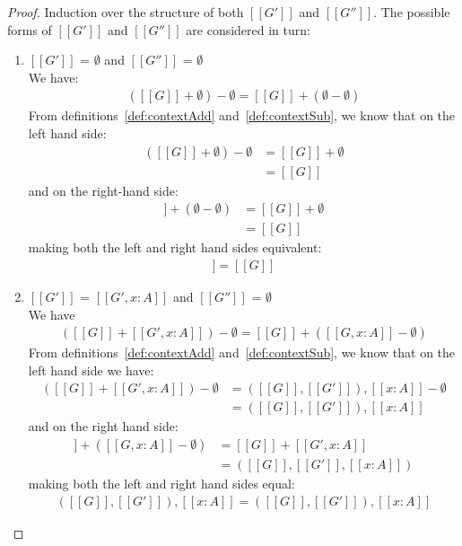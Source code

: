 \begin{proof}
  Induction over the structure of both $[[G']]$ and $[[G'']]$. The possible forms of
  $[[G']]$ and $[[G'']]$ are considered in turn:
  \begin{enumerate}
    \item $[[G']]$ = $\emptyset$ and $[[G'']]$ = $\emptyset$\\
      We have:
      \begin{align*}
        ([[G]] + \emptyset) - \emptyset = [[G]] + (\emptyset - \emptyset)
      \end{align*}
      From definitions~\ref{def:contextAdd} and~\ref{def:contextSub}, we know that
      on the left hand side:
      \begin{align*}
        ([[G]] + \emptyset) - \emptyset &= [[G]] + \emptyset \\
                                &= [[G]]
      \end{align*}
      and on the right-hand side:
      \begin{align*}
        [[G]] + (\emptyset - \emptyset) &= [[G]] + \emptyset \\
                                &= [[G]]
      \end{align*}
      making both the left and right hand sides equivalent:
      \begin{align*}
        [[G]] = [[G]]
      \end{align*}
    \item $[[G']]$ = $[[ G', x : A ]]$ and $[[G'']]$ = $\emptyset$\\
      We have
      \begin{align*}
        ([[G]] + [[G', x : A]]) - \emptyset = [[G]] + ([[G, x : A]] - \emptyset)
      \end{align*}
      From definitions~\ref{def:contextAdd} and~\ref{def:contextSub}, we know that
      on the left hand side we have:
      \begin{align*}
        ([[G]] + [[G', x : A]]) - \emptyset &= ([[G]], [[G']]), [[x : A]] - \emptyset \\
                                        &= ([[G]], [[G']]), [[x : A]]
      \end{align*}
      and on the right hand side:
      \begin{align*}
        [[G]] + ([[G, x : A]] - \emptyset) &= [[G]] + [[G', x : A]]\\
                                       &= ([[G]], [[G']], [[x : A]])
      \end{align*}
      making both the left and right hand sides equal:
      \begin{align*}
        ([[G]],[[G']]), [[x : A]] = ([[G]],[[G']]), [[x : A]]
      \end{align*}



\end{enumerate}
\end{proof}
